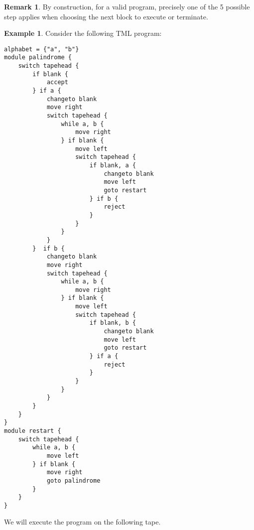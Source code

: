 \documentclass{amsart}
\theoremstyle{definition}
\newtheorem{remark}[rules]{Remark}
\newtheorem{example}[rules]{Example}
\begin{document}
    \begin{remark}
        By construction, for a valid program, precisely one of the 5 possible step applies when choosing the next block to execute or terminate.
    \end{remark}
    
    \begin{example}
        Consider the following TML program:
\begin{lstlisting}[language=TML]
alphabet = {"a", "b"}
module palindrome {
    switch tapehead {
        if blank {
            accept
        } if a {
            changeto blank
            move right
            switch tapehead {
                while a, b {
                    move right
                } if blank {
                    move left
                    switch tapehead {
                        if blank, a {
                            changeto blank
                            move left
                            goto restart
                        } if b {
                            reject
                        }
                    }
                }
            }
        }  if b {
            changeto blank
            move right
            switch tapehead {
                while a, b {
                    move right
                } if blank {
                    move left
                    switch tapehead {
                        if blank, b {
                            changeto blank
                            move left
                            goto restart
                        } if a {
                            reject
                        }
                    }
                }
            }
        }
    }
}
module restart {
    switch tapehead {
        while a, b {
            move left
        } if blank {
            move right
            goto palindrome
        }
    }
}
\end{lstlisting}
    We will execute the program on the following tape.
    \begin{figure}[H]
        \centering
\end{figure}
\end{example}
\end{document}
